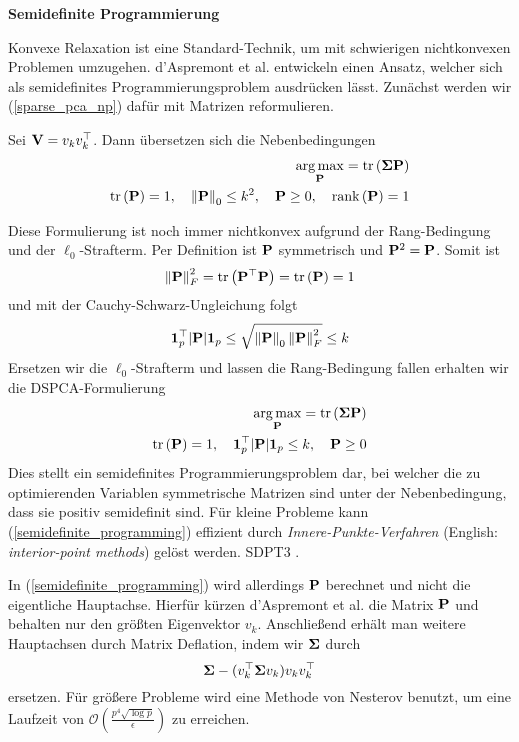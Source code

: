 \textbf{Semidefinite Programmierung}

Konvexe Relaxation ist eine Standard-Technik, um mit schwierigen nichtkonvexen Problemen umzugehen. d'Aspremont et al. \cite{daspremont_semidefinite} entwickeln einen Ansatz, welcher sich als semidefinites Programmierungsproblem ausdrücken lässt. Zunächst werden wir (\ref{sparse_pca_np}) dafür mit Matrizen reformulieren.

Sei $\mathbf{V} = v_kv_k^{\top}$. Dann übersetzen sich die Nebenbedingungen 
\begin{align}
\label{semidefinite_programming_naive}
\begin{split}
\operatorname*{arg\,max}_{\mathbf{P}} = \text{tr} \left( \mathbf{\Sigma}\mathbf{P} \right)\\
\text{tr} \left( \mathbf{P} \right) = 1, \quad \left\lVert \mathbf{P} \right\rVert_0 \leq k^2, \quad \mathbf{P} \geq 0, \quad \text{rank} \left( \mathbf{P} \right) = 1
\end{split}
\end{align}

Diese Formulierung ist noch immer nichtkonvex aufgrund der Rang-Bedingung  und der $\ell_0$-Strafterm. 
Per Definition ist $\mathbf{P}$ symmetrisch und $\mathbf{P}^2 = \mathbf{P}$. Somit ist
$$\left\lVert \mathbf{P} \right\rVert_{F}^{2} = \text{tr} \left( \mathbf{P}^{\top}\mathbf{P} \right) = \text{tr} \left( \mathbf{P} \right) = 1$$
und mit der Cauchy-Schwarz-Ungleichung folgt
$$\mathbf{1}_p^{\top} |\mathbf{P}| \mathbf{1}_p \leq \sqrt{\left\lVert \mathbf{P} \right\rVert_0 \left\lVert \mathbf{P} \right\rVert_F^2} \leq k$$
Ersetzen wir die $\ell_0$-Strafterm und lassen die Rang-Bedingung fallen erhalten wir die DSPCA-Formulierung
\begin{align}
\label{semidefinite_programming}
\begin{split}
\operatorname*{arg\,max}_{\mathbf{P}} = \text{tr} \left( \mathbf{\Sigma}\mathbf{P} \right)\\
\text{tr} \left( \mathbf{P} \right) = 1, \quad \mathbf{1}_p^{\top} |\mathbf{P}| \mathbf{1}_p \leq k, \quad \mathbf{P} \geq 0
\end{split}
\end{align}
Dies stellt ein semidefinites Programmierungsproblem dar, bei welcher die zu optimierenden Variablen symmetrische Matrizen sind unter der Nebenbedingung, dass sie positiv semidefinit sind. Für kleine Probleme kann (\ref{semidefinite_programming}) effizient durch \textit{Innere-Punkte-Verfahren} (English: \textit{interior-point methods}) gelöst werden. SDPT3 \cite{toh}.

In (\ref{semidefinite_programming}) wird allerdings $\mathbf{P}$ berechnet und nicht die eigentliche Hauptachse. Hierfür kürzen d'Aspremont et al. die Matrix $\mathbf{P}$ und behalten nur den größten Eigenvektor $v_k$. Anschließend erhält man weitere Hauptachsen durch Matrix Deflation, indem wir $\mathbf{\Sigma}$ durch
$$\mathbf{\Sigma} - (v_k^{\top}\mathbf{\Sigma} v_k) v_kv_k^{\top}$$ 
ersetzen. Für größere Probleme wird eine Methode von Nesterov benutzt, um eine Laufzeit von $\mathcal{O}(\frac{p^4\sqrt{\log{p}}}{\epsilon})$ zu erreichen.\\

